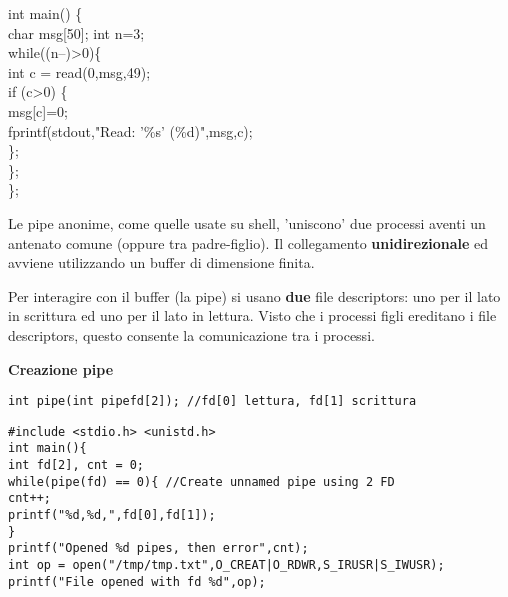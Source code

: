 \begin{flushleft}
\begin{flushleft}
\begin{flushleft}
{              int main() \{\\
              \halftab char msg[50]; int n=3;\\
              \halftab while((n--)>0)\{\\
              \tab int c = read(0,msg,49); \\
              \tab if (c>0) \{ \\
              \tab \halftab msg[c]=0;\\
              \tab \halftab fprintf(stdout,"Read: '\%s' (\%d)\n",msg,c);\\
              \tab \};\\
              \halftab \};\\
              \};}
    \end{flushleft}
    Le pipe anonime, come quelle usate su shell, 'uniscono' due processi aventi un 
    antenato comune (oppure tra padre-figlio). Il collegamento \ace \textbf{unidirezionale} ed 
    avviene utilizzando un buffer di dimensione finita.\par 
    Per interagire con il buffer (la pipe) si usano \textbf{due} file descriptors: 
    uno per il lato in scrittura ed uno per il lato in lettura. Visto che i 
    processi figli ereditano i file descriptors, questo consente la comunicazione tra i processi.
    \begin{flushleft}
      \textbf{Creazione pipe}\par 
      \texttt{int pipe(int pipefd[2]); //fd[0] lettura, fd[1] scrittura}\par 
      \begin{flushleft}
        \texttt{\#include <stdio.h> <unistd.h>\\
                int main()\{\\
                \halftab int fd[2], cnt = 0;\\
                \halftab while(pipe(fd) == 0)\{ //Create unnamed pipe using 2 FD\\
                \tab cnt++;\\
                \tab printf("\%d,\%d,",fd[0],fd[1]);\\
                \halftab \}\\
                \halftab printf("\n Opened \%d pipes, then error\n",cnt);\\
                \halftab int op = open("/tmp/tmp.txt",O\_CREAT|O\_RDWR,S\_IRUSR|S\_IWUSR);\\
                \halftab printf("File opened with fd \%d\n",op);\\
}
\end{flushleft}
\end{flushleft}
\end{flushleft}
\end{flushleft}
